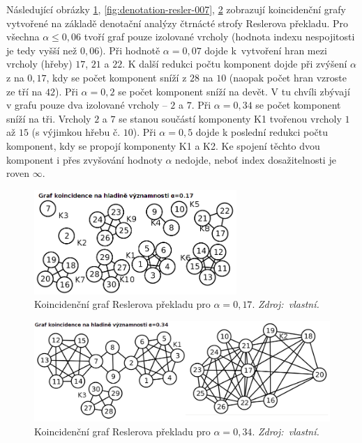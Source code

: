 \documentclass[dp.tex]{subfiles}
\begin{document}
Následující obrázky \ref{fig:denotation-resler-005}, \ref{fig:denotation-resler-007}, \ref{fig:denotation-resler-034}  zobrazují koincidenční grafy vytvořené na základě denotační analýzy čtrnácté strofy Reslerova překladu. Pro všechna $\alpha \leq 0{,}06$ tvoří graf pouze izolované vrcholy (hodnota indexu nespojitosti je tedy vyšší než $0{,}06$). Při hodnotě $\alpha = 0{,}07$ dojde k~vytvoření hran mezi vrcholy (hřeby) $17$, $21$ a $22$. K další redukci počtu komponent dojde při zvýšení $\alpha$ z na $0{,}17$, kdy se počet komponent sníží z $28$ na $10$ (naopak počet hran vzroste ze tří na $42$). Při $\alpha = 0{,}2$ se počet komponent sníží na devět. V tu chvíli zbývají v grafu pouze dva izolované vrcholy -- $2$ a $7$. Při $\alpha = 0{,}34$ se počet komponent sníží na tři. Vrcholy $2$ a $7$ se stanou součástí komponenty K1 tvořenou vrcholy $1$ až $15$ (s výjimkou hřebu č. $10$). Při $\alpha = 0{,}5$ dojde k poslední redukci počtu komponent, kdy se propojí komponenty K1 a K2. Ke spojení těchto dvou komponent i přes zvyšování hodnoty $\alpha$ nedojde, neboť index dosažitelnosti je roven $\infty$.

\begin{figure}[H]
	\centering
	\includegraphics[max width=\textwidth,height=150px,keepaspectratio=true]{imgs-70-prakticka/denotation-resler-017}
	\caption[Koincidenční graf Reslerova překladu pro $\alpha = 0{,}17$.]{Koincidenční graf Reslerova překladu pro $\alpha = 0{,}17$. \textit{Zdroj:~vlastní.}}
	\label{fig:denotation-resler-005}
\end{figure}

\begin{figure}[H]
	\centering
	\includegraphics[max width=\textwidth,keepaspectratio=true]{imgs-70-prakticka/denotation-resler-034}
	\caption[Koincidenční graf Reslerova překladu pro $\alpha = 0{,}34$.]{Koincidenční graf Reslerova překladu pro $\alpha = 0{,}34$. \textit{Zdroj:~vlastní.}}
	\label{fig:denotation-resler-034}
\end{figure}
\end{document}
